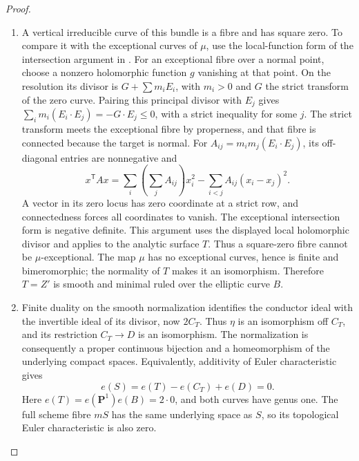 \begin{proof}
\begin{enumerate}[label={$\langle1\rangle$\arabic*.},leftmargin=*]
For completeness, the conductor transform at a point blowup
$\beta:X\to X_0$ is determined by
$K_X=\beta^*K_{X_0}+E$: its exceptional coefficient is
$\operatorname{mult}_p(D_0)-1$. This is the same canonical divisor
identity used above. A ruling $(-1)$-curve meeting $C'$ cannot be a
component of $V'$, since $C'\cap V'=\varnothing$; its intersection
with $K_{Z'}+2C'+V'$ would be at least $-1+2=1$.

Since $n=0$, one has $C'=\rho^*C_0$.
All components of $V'$ are $\rho$-exceptional, and
\[
 K_{Z'}=\rho^*K_{Z_0}+E_\rho
\]
with $E_\rho$ effective and positive on every exceptional prime.
Hence $E_\rho+V'$ is numerically trivial and exceptional.
The total transforms of the successive exceptional curves of a
point-blowup sequence give an orthogonal basis with square $-1$.
The exceptional intersection form is therefore negative definite.
It follows that $E_\rho+V'=0$. Effectiveness gives
$E_\rho=V'=0$, so $\rho$ is an isomorphism and $Z'$ is the minimal
ruled bundle.

\item A vertical irreducible curve of this bundle is a fibre and has
square zero. To compare it with the exceptional curves of $\mu$,
use the local-function form of the intersection argument in
\cite[\S1, p.~6]{Mumford1961}.
For an exceptional fibre over a normal point, choose a nonzero
holomorphic function $g$ vanishing at that point. On the resolution
its divisor is $G+\sum m_iE_i$, with $m_i>0$ and $G$ the strict
transform of the zero curve. Pairing this principal divisor with
$E_j$ gives
$\sum_i m_i(E_i\cdot E_j)=-G\cdot E_j\le0$, with a strict inequality
for some $j$. The strict transform meets the exceptional fibre by
properness, and that fibre is connected because the target is normal.
For $A_{ij}=m_im_j(E_i\cdot E_j)$, its off-diagonal entries are
nonnegative and
\[
 x^{\mathsf T}Ax
 =\sum_i\left(\sum_jA_{ij}\right)x_i^2
     -\sum_{i<j}A_{ij}(x_i-x_j)^2.
\]
A vector in its zero locus has zero coordinate at a strict row, and
connectedness forces all coordinates to vanish. The exceptional
intersection form is negative definite. This argument uses the
displayed local holomorphic divisor and applies to the analytic
surface $T$.
Thus a square-zero fibre cannot be $\mu$-exceptional. The map $\mu$
has no exceptional curves, hence is finite and bimeromorphic; the
normality of $T$ makes it an isomorphism. Therefore $T=Z'$ is smooth
and minimal ruled over the elliptic curve $B$.

\item Finite duality on the smooth normalization identifies the
conductor ideal with the invertible ideal of its divisor, now
$2C_T$. Thus $\eta$ is an isomorphism off $C_T$, and its restriction
$C_T\to D$ is an isomorphism. The normalization is consequently a
proper continuous bijection and a homeomorphism of the underlying
compact spaces. Equivalently, additivity of Euler characteristic
gives
\[
 e(S)=e(T)-e(C_T)+e(D)=0.
\]
Here $e(T)=e(\mathbf P^1)e(B)=2\cdot0$, and both curves have genus one.
The full scheme fibre $mS$ has the same underlying space as $S$,
so its topological Euler characteristic is also zero.
\end{enumerate}
\end{proof}
